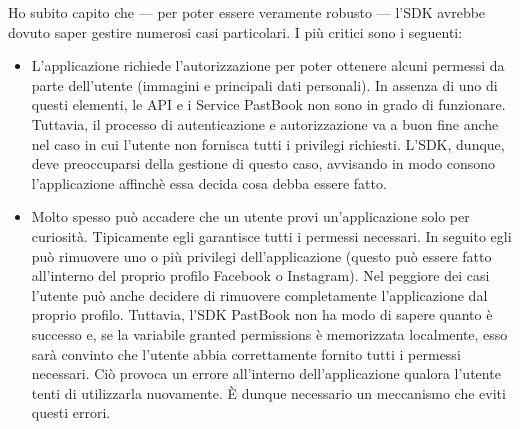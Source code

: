 				
				\noindent Ho subito capito che — per poter essere veramente robusto — l'SDK avrebbe dovuto saper gestire numerosi
				casi particolari. I più critici sono i seguenti:
				\begin{itemize}
					\item L'applicazione richiede l'autorizzazione per poter ottenere alcuni permessi da parte dell'utente
					(immagini e principali dati personali). In assenza di uno di questi elementi, le API e i Service PastBook non
					sono in grado di funzionare. Tuttavia, il processo di autenticazione e autorizzazione va a buon fine anche
					nel caso in cui l'utente non fornisca tutti i privilegi richiesti. L'SDK, dunque, deve preoccuparsi della
					gestione di questo caso, avvisando in modo consono l'applicazione affinchè essa decida cosa debba essere
					fatto.
					\item Molto spesso può accadere che un utente provi un'applicazione solo per curiosità. Tipicamente egli
					garantisce tutti i permessi necessari. In seguito egli può rimuovere uno o più privilegi dell'applicazione
					(questo può essere fatto all'interno del proprio profilo Facebook o Instagram). Nel peggiore dei casi
					l'utente può anche decidere di rimuovere completamente l'applicazione dal proprio profilo. 
					Tuttavia, l'SDK PastBook non ha modo di sapere quanto è successo e, se la variabile granted permissions è
					memorizzata localmente, esso sarà convinto che l'utente abbia correttamente fornito tutti i permessi
					necessari. Ciò provoca un errore all'interno dell'applicazione qualora l'utente tenti di utilizzarla
					nuovamente. È dunque necessario un meccanismo che eviti questi errori.
				\end{itemize}
